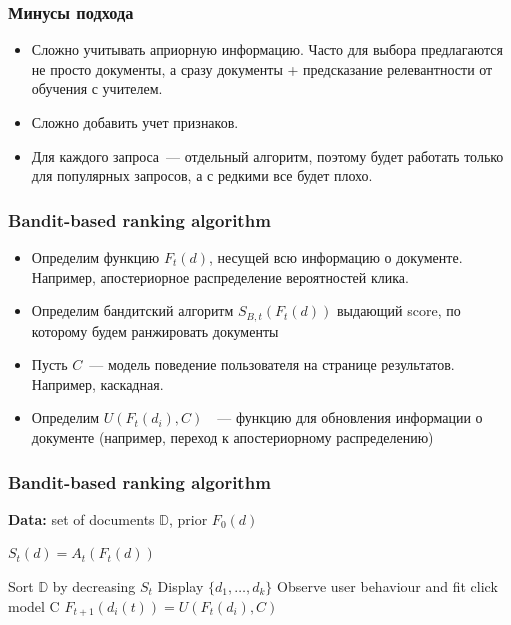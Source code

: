 \documentclass[xetex,mathserif,serif,table]{beamer}
\begin{document}
\begin{frame}
\frametitle{Минусы подхода}
\begin{itemize}
\item Сложно учитывать априорную информацию. Часто для выбора предлагаются не просто документы, а сразу документы + предсказание релевантности от обучения с учителем.
\item Сложно добавить учет признаков.
\item Для каждого запроса — отдельный алгоритм, поэтому будет работать только для популярных запросов, а с редкими все будет плохо.
\end{itemize}

\end{frame}



\begin{frame}
\frametitle{Bandit-based ranking algorithm}

\begin{itemize}
\item Определим функцию $F_t(d)$, несущей всю информацию о документе. Например, апостериорное распределение вероятностей клика. 
\item Определим бандитский алгоритм $S_{B, t}(F_t(d))$ выдающий score, по которому будем ранжировать документы
\item Пусть $C$ — модель поведение пользователя на странице результатов. Например, каскадная.
\item  Определим $U(F_t(d_i), C)$  — функцию для обновления информации о документе (например, переход к апостериорному распределению)
\end{itemize}

\end{frame}

\begin{frame}
\frametitle{Bandit-based ranking algorithm}

\begin{algorithmic}
\State \textbf{Data: } set of documents $\mathbb{D}$, prior $F_0(d)$
  
    \State $S_t(d) = A_t(F_t(d))$
  \EndFor
  
  \State Sort $\mathbb{D}$ by decreasing $S_t$
  \State Display $\{d_1, …, d_k\}$
  \State Observe user behaviour and fit click model C   
    \State $F_{t+1}(d_i(t)) = U(F_t(d_i), C)$
  \EndFor
\EndFor 
\end{algorithmic}

\end{frame}
\end{document}
